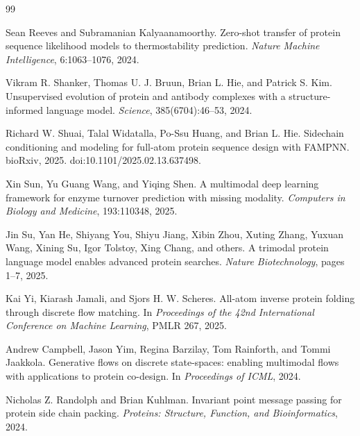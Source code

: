 \documentclass[11pt]{article}
\begin{document}
\begin{thebibliography}{99}
		
		Sean Reeves and Subramanian Kalyaanamoorthy.
		\newblock Zero-shot transfer of protein sequence likelihood models to thermostability prediction.
		\newblock \emph{Nature Machine Intelligence}, 6:1063--1076, 2024.
		
		Vikram R. Shanker, Thomas U. J. Bruun, Brian L. Hie, and Patrick S. Kim.
		\newblock Unsupervised evolution of protein and antibody complexes with a structure-informed language model.
		\newblock \emph{Science}, 385(6704):46--53, 2024.
		
		Richard W. Shuai, Talal Widatalla, Po-Ssu Huang, and Brian L. Hie.
		\newblock Sidechain conditioning and modeling for full-atom protein sequence design with FAMPNN.
		\newblock bioRxiv, 2025. doi:10.1101/2025.02.13.637498.
		
		Xin Sun, Yu Guang Wang, and Yiqing Shen.
		\newblock A multimodal deep learning framework for enzyme turnover prediction with missing modality.
		\newblock \emph{Computers in Biology and Medicine}, 193:110348, 2025.
		
		Jin Su, Yan He, Shiyang You, Shiyu Jiang, Xibin Zhou, Xuting Zhang, Yuxuan Wang, Xining Su, Igor Tolstoy, Xing Chang, and others.
		\newblock A trimodal protein language model enables advanced protein searches.
		\newblock \emph{Nature Biotechnology}, pages 1--7, 2025.
		
		
		Kai Yi, Kiarash Jamali, and Sjors H. W. Scheres.
		\newblock All-atom inverse protein folding through discrete flow matching.
		\newblock In \emph{Proceedings of the 42nd International Conference on Machine Learning}, PMLR 267, 2025.
		
		Andrew Campbell, Jason Yim, Regina Barzilay, Tom Rainforth, and Tommi Jaakkola.
		\newblock Generative flows on discrete state-spaces: enabling multimodal flows with applications to protein co-design.
		\newblock In \emph{Proceedings of ICML}, 2024.
		
		Nicholas Z. Randolph and Brian Kuhlman.
		\newblock Invariant point message passing for protein side chain packing.
		\newblock \emph{Proteins: Structure, Function, and Bioinformatics}, 2024.
		

\end{thebibliography}
\end{document}
